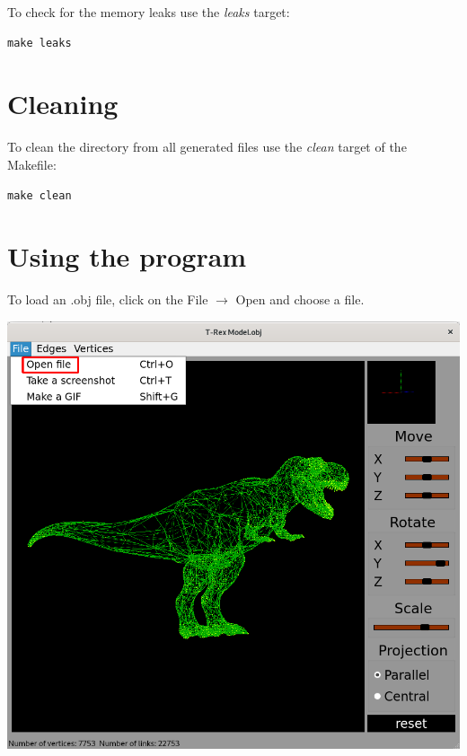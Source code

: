 \documentclass[a4paper, 12pt]{article}
\begin{document}
To check for the memory leaks use the \textit{leaks} target:
\begin{verbatim}
make leaks
\end{verbatim}

\section{Cleaning}

To clean the directory from all generated files use the \textit{clean} target of the Makefile:
\begin{verbatim}
make clean
\end{verbatim}

\newpage
\section{Using the program}

\large To load an .obj file, click on the File $\rightarrow$ Open and choose a file.
\begin{center}
  \includegraphics[width=1\textwidth]{images/open_file.png}
\end{center}
\end{document}
